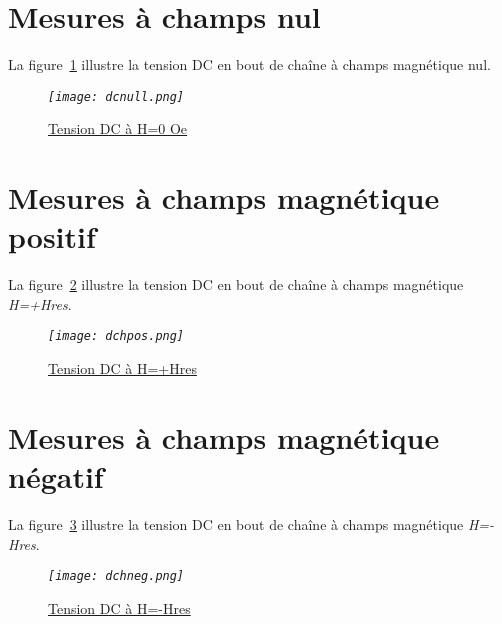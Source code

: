 \documentclass[12pt,fleqn]{book} %
\begin{document}
\section{Mesures à champs nul}
\noindent La figure~\underline{\color{blue}\ref{dcnull}} illustre la tension DC en bout de chaîne à champs magnétique nul.
\begin{figure}[H]
	\centering
	\itshape
	\texttt{[image: dcnull.png]}
	\caption{\label{dcnull} \underline{Tension DC à H=0 Oe}}
\end{figure}
\section{Mesures à champs magnétique positif}
\noindent La figure~\underline{\color{blue}\ref{dchpos}} illustre la tension DC en bout de chaîne à champs magnétique \emph{H=+Hres}.
\begin{figure}[H]
	\centering
	\itshape
	\texttt{[image: dchpos.png]}
	\caption{\label{dchpos} \underline{Tension DC à H=+Hres}}
\end{figure}
\section{Mesures à champs magnétique négatif}
\noindent La figure~\underline{\color{blue}\ref{dchneg}} illustre la tension DC en bout de chaîne à champs magnétique \emph{H=-Hres}.
\begin{figure}[H]
	\centering
	\itshape
	\texttt{[image: dchneg.png]}
	\caption{\label{dchneg} \underline{Tension DC à H=-Hres}}
\end{figure}
\end{document}
